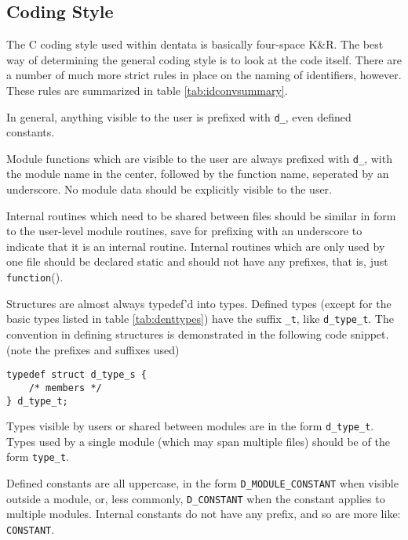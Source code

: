 \subsection{Coding Style}

The C coding style used within dentata is basically four-space
K\&R. The best way of determining the general coding style is to
look at the code itself. There are a number of much more strict
rules in place on the naming of identifiers, however. These
rules are summarized in table \ref{tab:idconvsummary}.

In general, anything visible to the user is prefixed with {\tt d\_},
even defined constants.

Module functions which are visible to the user are always prefixed with
{\tt d\_}, with the module name in the center, followed by the function
name, seperated by an underscore. No module data should be explicitly
visible to the user.

Internal routines which need to be shared between files should be similar
in form to the user-level module routines, save for prefixing with an
underscore to indicate that it is an internal routine.
Internal routines which are only used by one file should be declared
static and should not have any prefixes, that is, just {\tt
function}().

Structures are almost always typedef'd into types. Defined types (except
for the basic types listed in table \ref{tab:denttypes}) have the
suffix {\tt \_t}, like {\tt d\_type\_t}. The convention in defining
structures is demonstrated in the following code snippet. (note the
prefixes and suffixes used)

\begin{verbatim}
typedef struct d_type_s {
    /* members */
} d_type_t;
\end{verbatim}

Types visible by users or shared between modules are in the
form {\tt d\_type\_t}. Types used by a single module (which may
span multiple files) should be of the form {\tt type\_t}.

Defined constants are all uppercase, in the form {\tt D\_MODULE\_CONSTANT}
when visible outside a module, or, less commonly, {\tt D\_CONSTANT} when
the constant applies to multiple modules. Internal constants do not have
any prefix, and so are more like: {\tt CONSTANT}.

